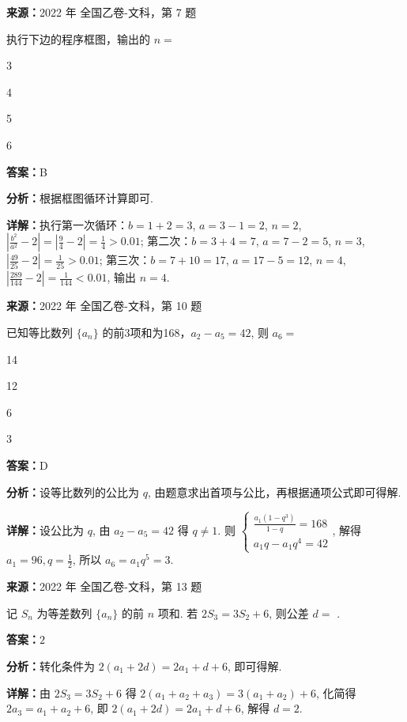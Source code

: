 \begin{question}[points=5]
\textbf{来源：}2022 年 全国乙卷-文科，第 7 题\par
执行下边的程序框图，输出的 $n =$
\begin{choices}
  \item 3
  \item 4
  \item 5
  \item 6
\end{choices}
\begin{solution}
\textbf{答案：}B

\textbf{分析：}根据框图循环计算即可.

\textbf{详解：}执行第一次循环：$b=1+2=3$, $a=3-1=2$, $n=2$, $\left|\frac{b^2}{a^2}-2\right|=\left|\frac{9}{4}-2\right|=\frac{1}{4}>0.01$; 第二次：$b=3+4=7$, $a=7-2=5$, $n=3$, $\left|\frac{49}{25}-2\right|=\frac{1}{25}>0.01$; 第三次：$b=7+10=17$, $a=17-5=12$, $n=4$, $\left|\frac{289}{144}-2\right|=\frac{1}{144}<0.01$, 输出 $n=4$.
\end{solution}
\end{question}

\begin{question}[points=5]
\textbf{来源：}2022 年 全国乙卷-文科，第 10 题\par
已知等比数列 $\{a_n\}$ 的前3项和为168，$a_2 - a_5 = 42$, 则 $a_6 =$
\begin{choices}
  \item 14
  \item 12
  \item 6
  \item 3
\end{choices}
\begin{solution}
\textbf{答案：}D

\textbf{分析：}设等比数列的公比为 $q$, 由题意求出首项与公比，再根据通项公式即可得解.

\textbf{详解：}设公比为 $q$, 由 $a_2-a_5=42$ 得 $q\neq1$. 则 $\begin{cases} \frac{a_1(1-q^3)}{1-q}=168 \\ a_1q - a_1q^4 = 42 \end{cases}$, 解得 $a_1=96, q=\frac12$, 所以 $a_6 = a_1q^5 = 3$.
\end{solution}
\end{question}

\begin{question}[points=5]
\textbf{来源：}2022 年 全国乙卷-文科，第 13 题\par
记 $S_n$ 为等差数列 $\{a_n\}$ 的前 $n$ 项和. 若 $2S_3 = 3S_2 + 6$, 则公差 $d =$ .
\fillin[{$2$}]
\begin{solution}
\textbf{答案：}$2$

\textbf{分析：}转化条件为 $2(a_1+2d)=2a_1+d+6$, 即可得解.

\textbf{详解：}由 $2S_3=3S_2+6$ 得 $2(a_1+a_2+a_3)=3(a_1+a_2)+6$, 化简得 $2a_3=a_1+a_2+6$, 即 $2(a_1+2d)=2a_1+d+6$, 解得 $d=2$.
\end{solution}
\end{question}

